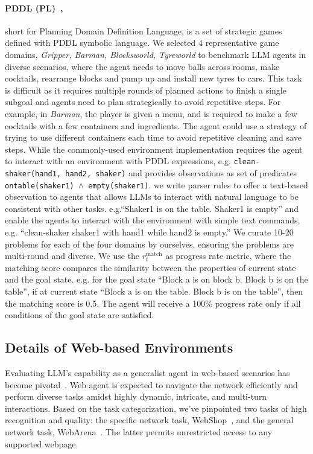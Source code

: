 \paragraph{PDDL (PL)~\citep{vallati20152014},} short for Planning Domain Definition Language, is a set of strategic games defined with PDDL symbolic language. 
We selected 4 representative game domains, \textit{Gripper, Barman, Blocksworld, Tyreworld} to benchmark LLM agents in diverse scenarios, where the agent needs to move balls across rooms, make cocktails, rearrange blocks and pump up and install new tyres to cars. 
This task is difficult as it requires multiple rounds of planned actions to finish a single subgoal and agents need to plan strategically to avoid repetitive steps. 
For example, in \textit{Barman}, the player is given a menu, and is required to make a few cocktails with a few containers and ingredients. The agent could use a strategy of trying to use different containers each time to avoid repetitive cleaning and save steps. 
While the commonly-used environment implementation \citep{silver2020pddlgym} requires the agent to interact with an environment with PDDL expressions, 
e.g. \texttt{clean-shaker(hand1, hand2, shaker)} and provides observations as set of predicates \texttt{ontable(shaker1) $\wedge$ empty(shaker1)}.  
we write parser rules to offer a text-based observation to agents that allows LLMs to interact with natural language to be consistent with other tasks. 
e.g.“Shaker1 is on the table. Shaker1 is empty” and enable the agents to interact with the environment with simple text commands, e.g. “clean-shaker shaker1 with hand1 while hand2 is empty.” 
We curate 10-20 problems for each of the four domains by ourselves, ensuring the problems are multi-round and diverse. 
We use the $r_t^{\text{match}}$ as progress rate metric, where the matching score compares the similarity between the properties of current state and the goal state. 
e.g. for the goal state ``Block a is on block b. Block b is on the table'', if at current state ``Block a is on the table. Block b is on the table'', then the matching score is 0.5. The agent will receive a 100\% progress rate only if all conditions of the goal state are satisfied.

\subsection{Details of Web-based Environments}
Evaluating LLM's capability as a generalist agent in web-based scenarios has become pivotal~\citep{Shi2017WorldOB, deng2023mind2web}. 
Web agent is expected to navigate the network efficiently and perform diverse tasks amidst highly dynamic, intricate, and multi-turn interactions. 
Based on the task categorization, we've pinpointed two tasks of high recognition and quality: the specific network task, WebShop~\citep{yao2022webshop}, and the general network task, WebArena~\citep{zhou2023webarena}. The latter permits unrestricted access to any supported webpage.

